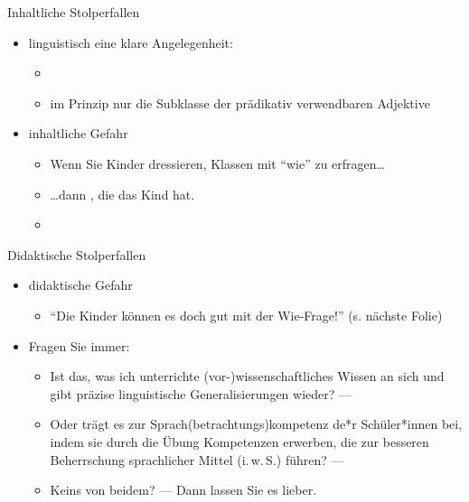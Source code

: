 \begin{frame}
  {Inhaltliche Stolperfallen}
  \pause
  \begin{itemize}[<+->]
    \item linguistisch eine klare Angelegenheit:
      \begin{itemize}[<+->]
        \item {}
        \item im Prinzip nur die Subklasse der prädikativ verwendbaren Adjektive
      \end{itemize}
     \Halbzeile
    \item inhaltliche Gefahr
      \begin{itemize}[<+->]
        \item Wenn Sie Kinder dressieren,  Klassen mit "`wie"' zu erfragen\ldots
        \item \ldots dann , die das Kind hat.
          \Halbzeile
        \item {}
      \end{itemize}
  \end{itemize}
\end{frame}

\begin{frame}
  {Didaktische Stolperfallen}
  \pause
  \begin{itemize}[<+->]
    \item didaktische Gefahr
      \begin{itemize}[<+->]
        \item "`Die Kinder können es doch gut mit der Wie-Frage!"' (s. nächste Folie)
      \end{itemize}
      \Halbzeile
    \item Fragen Sie immer:
      \Halbzeile
      \begin{itemize}[<+->]
        \item Ist das, was ich unterrichte (vor-)wissenschaftliches Wissen an sich \alert{und gibt präzise linguistische Generalisierungen wieder?} --- 
          \Halbzeile
        \item Oder trägt es zur Sprach(betrachtungs)kompetenz de*r Schüler*innen bei, indem sie durch die Übung \alert{Kompetenzen} erwerben, die zur \alert{besseren Beherrschung sprachlicher Mittel} (i.\,w.\,S.) führen? --- 
          \Halbzeile
        \item Keins von beidem? ---  Dann lassen Sie es lieber.
      \end{itemize}
  \end{itemize}
\end{frame}

